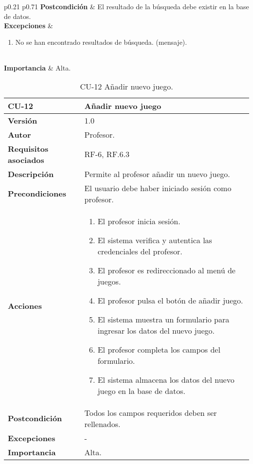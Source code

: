 \begin{table}[h!]
\begin{tabularx}{\linewidth}{ p{0.21\columnwidth} p{0.71\columnwidth} }
         \textbf{Postcondición}             & El resultado de la búsqueda debe existir en la base de datos. \\
		\textbf{Excepciones}             &
		\begin{enumerate}
			\def\labelenumi{\arabic{enumi}.}
			\tightlist
			\item No se han encontrado resultados de búsqueda. (mensaje).
		\end{enumerate}\\
		\textbf{Importancia}          & Alta. \\
		\bottomrule
	\end{tabularx}
	\caption{CU-11 Ver menú juegos profesor.}
\end{table}

\begin{table}[h!]
	\centering
	\begin{tabularx}{\linewidth}{ p{} p{} }
		\toprule
		\textbf{CU-12}    & \textbf{Añadir nuevo juego}\\
		\toprule
		\textbf{Versión}              & 1.0    \\
		\textbf{Autor}                & Profesor. \\
		\textbf{Requisitos asociados} & RF-6, RF.6.3 \\
		\textbf{Descripción}          & Permite al profesor añadir un nuevo juego.\\
		\textbf{Precondiciones}         & El usuario debe haber iniciado sesión como profesor. \\
		\textbf{Acciones}             &
		\begin{enumerate}
			\def\labelenumi{\arabic{enumi}.}
			\tightlist
			\item El profesor inicia sesión.
            \item El sistema verifica y autentica las credenciales del profesor.
            \item El profesor es redireccionado al menú de juegos.
            \item El profesor pulsa el botón de añadir juego.
            \item El sistema muestra un formulario para ingresar los datos del nuevo juego.
    	\item El profesor completa los campos del formulario.
    	\item El sistema almacena los datos del nuevo juego en la base de datos.
		\end{enumerate}\\
         \textbf{Postcondición}             & Todos los campos requeridos deben ser rellenados. \\
		\textbf{Excepciones}             & - \\
		\textbf{Importancia}          & Alta. \\
		\bottomrule
	\end{tabularx}
	\caption{CU-12 Añadir nuevo juego.}
\end{table}

